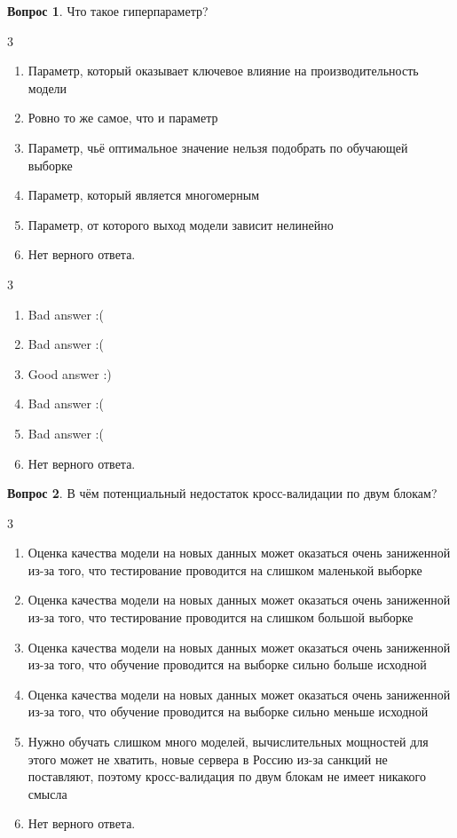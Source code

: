 \documentclass[12pt]{article}
\newenvironment{answerlist}[1][3]{
\begin{multicols}{#1}

\begin{enumerate}[label=\fbox{\emph{\Alph*}},ref=\emph{\alph*}]
}
{
\item Нет верного ответа.
\end{enumerate}
\end{multicols}
}
\theoremstyle{definition}
\newtheorem{question}{Вопрос}
\begin{document}
\begin{question}
Что такое гиперпараметр?
\begin{answerlist}
  \item Параметр, который оказывает ключевое влияние на производительность модели
  \item Ровно то же самое, что и параметр
  \item Параметр, чьё оптимальное значение нельзя подобрать по обучающей выборке
  \item Параметр, который является многомерным
  \item Параметр, от которого выход модели зависит нелинейно
\end{answerlist}
\end{question}

\begin{solution}
\begin{answerlist}
  \item Bad answer :(
  \item Bad answer :(
  \item Good answer :)
  \item Bad answer :(
  \item Bad answer :(
\end{answerlist}
\end{solution}

\newpage 

\begin{question}
В чём потенциальный недостаток кросс-валидации по двум блокам?

\begin{answerlist}
   \item Оценка качества модели на новых данных может оказаться очень заниженной из-за того, что тестирование проводится на слишком маленькой выборке
   \item Оценка качества модели на новых данных может оказаться очень заниженной из-за того, что тестирование проводится на слишком большой выборке
   \item Оценка качества модели на новых данных может оказаться очень заниженной из-за того, что обучение проводится на выборке сильно больше исходной
  \item Оценка качества модели на новых данных может оказаться очень заниженной из-за того, что обучение проводится на выборке сильно меньше исходной
  \item Нужно обучать слишком много моделей, вычислительных мощностей для этого может не хватить, новые сервера в Россию из-за санкций не поставляют, поэтому кросс-валидация по двум блокам не имеет никакого смысла
\end{answerlist}
\end{question}
\end{document}
